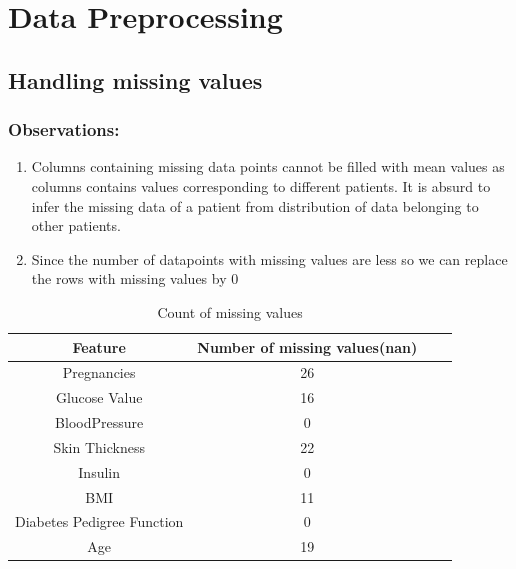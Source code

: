 \documentclass[12pt]{article}
\begin{document}
\section{Data Preprocessing}

\subsection{Handling missing values}

\subsubsection{Observations:}
\begin{enumerate}
\item Columns containing missing data points cannot be filled with mean values as columns contains values corresponding to different patients. It is absurd to infer the missing data of a patient from distribution of data belonging to other patients.
\item Since the number of datapoints with missing values are less so we can replace the rows with missing values by 0 
\end{enumerate}
\begin{table}[h]
\begin{center}
\begin{tabular}{|c|c|c|c|}
\hline
 \textbf{Feature} & \textbf{Number of missing values(nan)}\\\hline
Pregnancies  & 26\\\hline
Glucose Value  & 16\\\hline
BloodPressure  & 0\\\hline
Skin Thickness & 22\\\hline
Insulin  & 0\\\hline
BMI  & 11\\\hline
Diabetes Pedigree Function  & 0\\\hline
Age  & 19\\\hline
\end{tabular}
\end{center}
\caption{Count of missing values}
\end{table}
\end{document}
